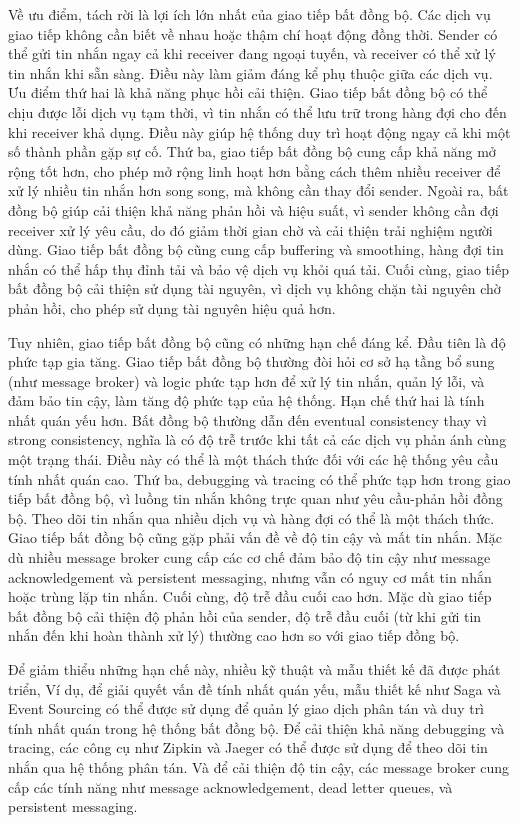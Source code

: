 Về ưu điểm, tách rời là lợi ích lớn nhất của giao tiếp bất đồng bộ. Các dịch vụ giao tiếp không cần biết về nhau hoặc thậm chí hoạt động đồng thời. Sender có thể gửi tin nhắn ngay cả khi receiver đang ngoại tuyến, và receiver có thể xử lý tin nhắn khi sẵn sàng. Điều này làm giảm đáng kể phụ thuộc giữa các dịch vụ. Ưu điểm thứ hai là khả năng phục hồi cải thiện. Giao tiếp bất đồng bộ có thể chịu được lỗi dịch vụ tạm thời, vì tin nhắn có thể lưu trữ trong hàng đợi cho đến khi receiver khả dụng. Điều này giúp hệ thống duy trì hoạt động ngay cả khi một số thành phần gặp sự cố. Thứ ba, giao tiếp bất đồng bộ cung cấp khả năng mở rộng tốt hơn, cho phép mở rộng linh hoạt hơn bằng cách thêm nhiều receiver để xử lý nhiều tin nhắn hơn song song, mà không cần thay đổi sender. Ngoài ra, bất đồng bộ giúp cải thiện khả năng phản hồi và hiệu suất, vì sender không cần đợi receiver xử lý yêu cầu, do đó giảm thời gian chờ và cải thiện trải nghiệm người dùng. Giao tiếp bất đồng bộ cũng cung cấp buffering và smoothing, hàng đợi tin nhắn có thể hấp thụ đỉnh tải và bảo vệ dịch vụ khỏi quá tải. Cuối cùng, giao tiếp bất đồng bộ cải thiện sử dụng tài nguyên, vì dịch vụ không chặn tài nguyên chờ phản hồi, cho phép sử dụng tài nguyên hiệu quả hơn.

Tuy nhiên, giao tiếp bất đồng bộ cũng có những hạn chế đáng kể. Đầu tiên là độ phức tạp gia tăng. Giao tiếp bất đồng bộ thường đòi hỏi cơ sở hạ tầng bổ sung (như message broker) và logic phức tạp hơn để xử lý tin nhắn, quản lý lỗi, và đảm bảo tin cậy, làm tăng độ phức tạp của hệ thống. Hạn chế thứ hai là tính nhất quán yếu hơn. Bất đồng bộ thường dẫn đến eventual consistency thay vì strong consistency, nghĩa là có độ trễ trước khi tất cả các dịch vụ phản ánh cùng một trạng thái. Điều này có thể là một thách thức đối với các hệ thống yêu cầu tính nhất quán cao. Thứ ba, debugging và tracing có thể phức tạp hơn trong giao tiếp bất đồng bộ, vì luồng tin nhắn không trực quan như yêu cầu-phản hồi đồng bộ. Theo dõi tin nhắn qua nhiều dịch vụ và hàng đợi có thể là một thách thức. Giao tiếp bất đồng bộ cũng gặp phải vấn đề về độ tin cậy và mất tin nhắn. Mặc dù nhiều message broker cung cấp các cơ chế đảm bảo độ tin cậy như message acknowledgement và persistent messaging, nhưng vẫn có nguy cơ mất tin nhắn hoặc trùng lặp tin nhắn. Cuối cùng, độ trễ đầu cuối cao hơn. Mặc dù giao tiếp bất đồng bộ cải thiện độ phản hồi của sender, độ trễ đầu cuối (từ khi gửi tin nhắn đến khi hoàn thành xử lý) thường cao hơn so với giao tiếp đồng bộ.

Để giảm thiểu những hạn chế này, nhiều kỹ thuật và mẫu thiết kế đã được phát triển, Ví dụ, để giải quyết vấn đề tính nhất quán yếu, mẫu thiết kế như Saga và Event Sourcing có thể được sử dụng để quản lý giao dịch phân tán và duy trì tính nhất quán trong hệ thống bất đồng bộ. Để cải thiện khả năng debugging và tracing, các công cụ như Zipkin và Jaeger có thể được sử dụng để theo dõi tin nhắn qua hệ thống phân tán. Và để cải thiện độ tin cậy, các message broker cung cấp các tính năng như message acknowledgement, dead letter queues, và persistent messaging.

